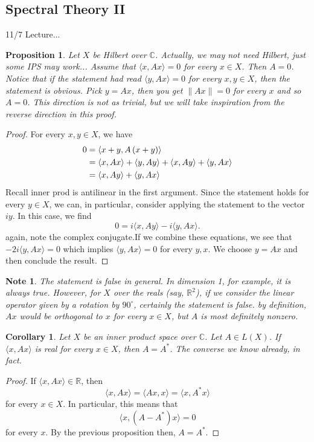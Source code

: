 \documentclass[letterpaper,twoside,11pt]{article}
\theoremstyle{mystyle}
\newtheorem{corollary}{Corollary}[theorem]
\newtheorem{prop}{Proposition}[section]
\newtheorem*{note}{Note}
\newcommand{\R}{{\mathbb R}}
\newcommand{\C}{{\mathbb C}}
\newcommand{\cg}{\color{gray}}
\newcommand{\cbk}{\color{black}}
\newcommand{\cred}{\color{red}}
\begin{document}
\subsection{Spectral Theory II}


\cred 11/7 Lecture...\cbk

\begin{prop}
  Let $X$ be Hilbert over $\C$. \cg Actually, we may not need Hilbert, just some IPS may work... \cbk Assume that $\langle x, Ax \rangle = 0 $ for every $x\in X$. Then $A=0$. \cg Notice that if the statement had read $\langle y, Ax \rangle = 0$ for every $x, y\in X$, then the statement is obvious. Pick $y = Ax$, then you get $\|Ax\|=0$ for every $x$ and so $A=0$. This direction is not as trivial, but we will take inspiration from the reverse direction in this proof. \cbk
\end{prop}
\begin{proof}
  For every $x, y\in X$, we have
  \begin{align*}
    0 &= \left\langle {x + y,A\left( {x + y} \right)} \right\rangle  \hfill \\
     &= \left\langle {x,Ax} \right\rangle  + \left\langle {y,Ay} \right\rangle  + \left\langle {x,Ay} \right\rangle  + \left\langle {y,Ax} \right\rangle  \hfill \\
     &= \left\langle {x,Ay} \right\rangle  + \left\langle {y,Ax} \right\rangle  
  \end{align*}
  \cg Recall inner prod is antilinear in the first argument. \cbk 
  Since the statement holds for every $y\in X$, we can, in particular, consider applying the statement to the vector $iy$. In this case, we find 
  \[0 = i\langle x, Ay\rangle -i \langle y, Ax\rangle.\]
  \cg again, note the complex conjugate.\cbk If we combine these equations, we see that $-2i\langle y, Ax\rangle =0$ which implies $\langle y, Ax\rangle = 0 $ for every $y, x$. We choose $y = Ax$ and then conclude the result. 
\end{proof}
\begin{note}
  The statement is false in general. In dimension 1, for example, it is always true. However, for $X$ over the reals (say, $\R^2$), if we consider the linear operator given by a rotation by $90^\circ$, certainly the statement is false. \cg by definition, $Ax$ would be orthogonal to $x$ for every $x\in X$, but $A$ is most definitely nonzero.\cbk 
\end{note}
\begin{corollary}
  Let $X$ be an inner product space over $\C$. Let $A\in L(X)$. If $\langle x, Ax\rangle$ is real for every $x\in X$, then $A= A^*$. 
  \cg The converse we know already, in fact. \cbk
\end{corollary}
\begin{proof}
  If $\langle x, Ax\rangle \in \R$, then 
  \[\langle x, Ax\rangle = \langle Ax, x \rangle = \langle x, A^* x \rangle\] for every $x\in X$. In particular, this means that 
  \[\langle x, (A-A^*)x\rangle = 0 \] for every $x$. By the previous proposition then, $A = A^*$. 
\end{proof}
\end{document}
